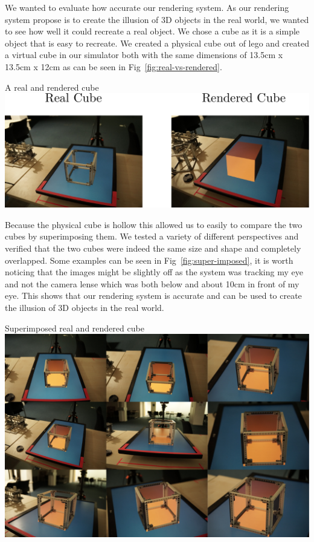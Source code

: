 We wanted to evaluate how accurate our rendering system. As our rendering system propose is to create the illusion of 3D objects in the real world, we wanted to see how well it could recreate a real object. We chose a cube as it is a simple object that is easy to recreate. We created a physical cube out of lego and created a virtual cube in our simulator both with the same dimensions of 13.5cm x 13.5cm x 12cm as can be seen in Fig~\ref{fig:real-vs-rendered}.

\begin{figureBox}[label={fig:real-vs-rendered}, width=1.0\linewidth]{A real and rendered cube}
	\includegraphics[width = 1.0\linewidth]{./evaluation/figures/real-vs-rendered.pdf}
\end{figureBox}

Because the physical cube is hollow this allowed us to easily to compare the two cubes by superimposing them. We tested a variety of different perspectives and verified that the two cubes were indeed the same size and shape and completely overlapped. Some examples can be seen in Fig~\ref{fig:super-imposed}, it is worth noticing that the images might be slightly off as the system was tracking my eye and not the camera lense which was both below and about 10cm in front of my eye. This shows that our rendering system is accurate and can be used to create the illusion of 3D objects in the real world. 

\begin{figureBox}[label={fig:super-imposed}, width=1.0\linewidth]{Superimposed real and rendered cube}
	\includegraphics[width = 1.0\linewidth]{./evaluation/figures/super-imposed.pdf}
\end{figureBox}

